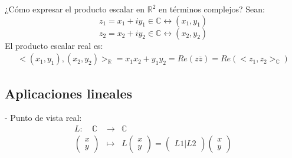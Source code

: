 ¿Cómo expresar el producto escalar en \(\mathbb{R}^{2}\) en términos complejos?
Sean:
\[z_1 = x_1+iy_1 \in \mathbb{C} \leftrightarrow (x_1,y_1)\]
\[z_2 = x_2+iy_2 \in \mathbb{C} \leftrightarrow (x_2,y_2)\]
El producto escalar real es:
\begin{eqnarray*}
  <(x_1,y_1),(x_2,y_2)>_{\mathbb{R}} = x_1x_2+y_1y_2 = Re(z\overline{z}) = Re(<z_1,z_2>_{\mathbb{C}})
\end{eqnarray*}
\subsection{Aplicaciones lineales}

- Punto de vista real:
\begin{eqnarray*}
  L : \quad \mathbb{C}^{ } & \rightarrow & \mathbb{C}^{} \\
 \begin{pmatrix}
   x \\
   y
 \end{pmatrix} & \mapsto & L\begin{pmatrix}
   x \\
   y
 \end{pmatrix} = \begin{pmatrix}
   L1 | L2
 \end{pmatrix}\begin{pmatrix}
   x \\
   y
 \end{pmatrix}
\end{eqnarray*}

